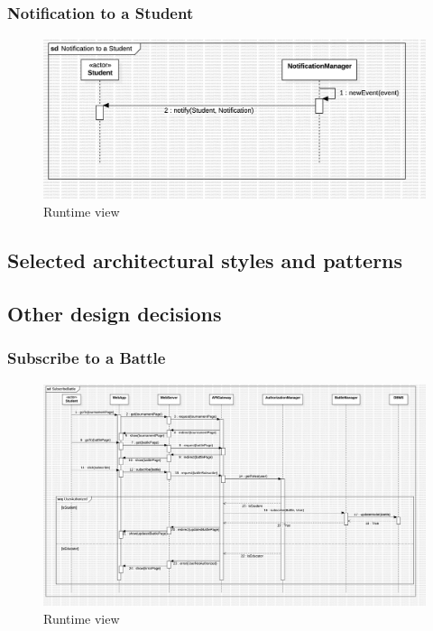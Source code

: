\subsubsection*{Notification to a Student}
\begin{figure}[H]
    \centering
    \includegraphics[width=\textwidth]{Diagrams/NotificationToStudentSD.jpg}
    \caption{Runtime view}
    \label{fig:runtime_view}
\end{figure}
\subsection{Selected architectural styles and patterns}
\subsection{Other design decisions}

\subsubsection*{Subscribe to a Battle}
\begin{figure}[H]
    \centering
    \includegraphics[width=\textwidth]{Diagrams/SubscribeBattleSD.jpg}
    \caption{Runtime view}
\label{fig:runtime_view}
\end{figure}

